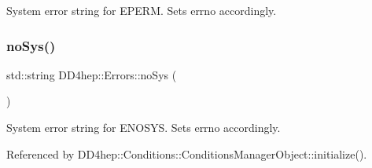 System error string for E\+P\+E\+RM. Sets errno accordingly. 

\hypertarget{namespace_d_d4hep_1_1_errors_a70d74e1cb3eced52822c830c2bf4990b}{}\label{namespace_d_d4hep_1_1_errors_a70d74e1cb3eced52822c830c2bf4990b} 
\subsubsection{\texorpdfstring{no\+Sys()}{noSys()}}
{\footnotesize\ttfamily std\+::string D\+D4hep\+::\+Errors\+::no\+Sys (\begin{DoxyParamCaption}{ }\end{DoxyParamCaption})}



System error string for E\+N\+O\+S\+YS. Sets errno accordingly. 



Referenced by D\+D4hep\+::\+Conditions\+::\+Conditions\+Manager\+Object\+::initialize().

